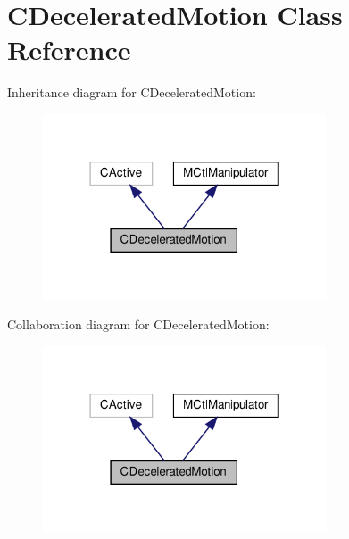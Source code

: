 \hypertarget{classCDeceleratedMotion}{}\section{C\+Decelerated\+Motion Class Reference}
\label{classCDeceleratedMotion}


Inheritance diagram for C\+Decelerated\+Motion\+:
\nopagebreak
\begin{figure}[H]
\begin{center}
\leavevmode
\includegraphics[width=238pt]{classCDeceleratedMotion__inherit__graph}
\end{center}
\end{figure}


Collaboration diagram for C\+Decelerated\+Motion\+:
\nopagebreak
\begin{figure}[H]
\begin{center}
\leavevmode
\includegraphics[width=238pt]{classCDeceleratedMotion__coll__graph}
\end{center}
\end{figure}
